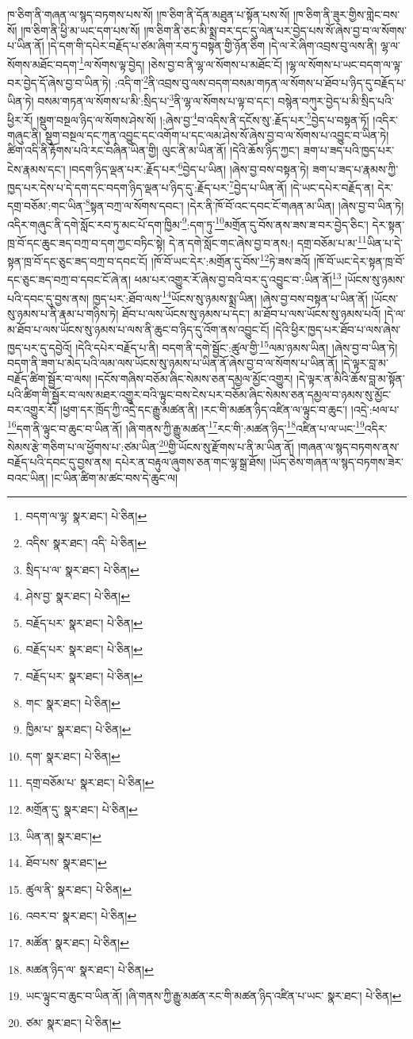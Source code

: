 ཁ་ཅིག་ནི་གཞན་ལ་སྙད་བཏགས་པས་སོ། །ཁ་ཅིག་ནི་དོན་མཐུན་པ་སྟོན་པས་སོ། །ཁ་ཅིག་ནི་ཟུར་གྱིས་གླེང་བས་སོ། །ཁ་ཅིག་ནི་ཕྱི་མ་ཡང་དག་པས་སོ། །ཁ་ཅིག་ནི་ཅང་མི་སྨྲ་བར་དང་དུ་ལེན་པར་བྱེད་པས་སོ་ཞེས་བྱ་བ་ལ་སོགས་པ་ཡིན་ནོ། །དེ་དག་གི་དཔེར་བརྗོད་པ་ཙམ་ཞིག་རབ་ཏུ་བསྟན་གྱི་ཉོན་ཅིག །དེ་ལ་རེ་ཞིག་འབྲས་བུ་ལས་ནི། ལྷ་ལ་སོགས་མཐོང་བདག་\footnote{བདག་ལ་ལྷ་  སྣར་ཐང་།  པེ་ཅིན། }ལ་སོགས་ལྟ་བྱེད། །ཅེས་བྱ་བ་ནི་ལྷ་ལ་སོགས་པ་མཐོང་ངོ། །ལྷ་ལ་སོགས་པ་ཡང་བདག་ལ་ལྟ་བར་བྱེད་དོ་ཞེས་བྱ་བ་ཡིན་ཏེ། :འདི་ག་\footnote{འདིས་  སྣར་ཐང་། འདི་  པེ་ཅིན། }ནི་འབྲས་བུ་ལས་བདག་བསམ་གཏན་ལ་སོགས་པ་ཐོབ་པ་ཉིད་དུ་བརྗོད་པ་ཡིན་ཏེ། བསམ་གཏན་ལ་སོགས་པ་མི་:སྲིད་པ་\footnote{སྲིད་པ་ལ་  སྣར་ཐང་།  པེ་ཅིན། }ནི་ལྷ་ལ་སོགས་པ་ལྟ་བ་དང་། བསྙེན་བཀུར་བྱེད་པ་མི་སྲིད་པའི་ཕྱིར་རོ། །སྡུག་བསྔལ་ཉིད་ལ་སོགས་ཤེས་སོ། །:ཞེས་བྱ་\footnote{ཤེས་བྱ་  སྣར་ཐང་།  པེ་ཅིན། }བ་འདིས་ནི་དངོས་སུ་:རྗོད་པར་\footnote{བརྗོད་པར་  སྣར་ཐང་།  པེ་ཅིན། }བྱེད་པ་བསྟན་ཏོ། །འདིར་གཞུང་ནི། སྡུག་བསྔལ་དང་ཀུན་འབྱུང་དང་འགོག་པ་དང་ལམ་ཤེས་སོ་ཞེས་བྱ་བ་ལ་སོགས་པ་འབྱུང་བ་ཡིན་ཏེ། ཚིག་འདི་ནི་རྟོགས་པའི་རང་བཞིན་ཡིན་གྱི། ལུང་ནི་མ་ཡིན་ནོ། །དེའི་ཆོས་ཉིད་ཀྱང་། ཟག་པ་ཟད་པའི་ཁྱད་པར་ངེས་རྣམས་དང་། །བདག་ཉིད་ལྡན་པར་:རྗོད་པར་\footnote{བརྗོད་པར་  སྣར་ཐང་།  པེ་ཅིན། }བྱེད་པ་ཡིན། །ཞེས་བྱ་བས་བསྟན་ཏེ། ཟག་པ་ཟད་པ་རྣམས་ཀྱི་ཁྱད་པར་དེས་པ་དེ་དག་དང་བདག་ཉིད་ལྡན་པ་ཉིད་དུ་:རྗོད་པར་\footnote{བརྗོད་པར་  སྣར་ཐང་།  པེ་ཅིན། }བྱེད་པ་ཡིན་ནོ། །དེ་ཡང་དཔེར་བརྗོད་ན། དེར་དགྲ་བཅོམ་:གང་ཡིན་\footnote{གང་  སྣར་ཐང་།  པེ་ཅིན། }སྟན་བཀྲ་ལ་སོགས་དབང་། །དེར་ནི་ཁོ་བོ་འང་དབང་ངོ་གཞན་མ་ཡིན། །ཞེས་བྱ་བ་ཡིན་ཏེ། འདིར་གཞུང་ནི་དགེ་སློང་རབ་ཏུ་མང་པོ་དག་ཁྱིམ་\footnote{ཁྱིམ་པ་  སྣར་ཐང་།  པེ་ཅིན། }:དག་ཏུ་\footnote{དག་  སྣར་ཐང་།  པེ་ཅིན། }མགྲོན་དུ་བོས་ནས་ཟས་ཟ་བར་བྱེད་ཅིང་། དེར་སྟན་ཁྲ་བོ་དང་ཆུང་ཟད་བཀྲ་བ་དག་ཀྱང་བཏིང་སྟེ། དེ་ན་དགེ་སློང་གང་ཞེས་བྱ་བ་ནས:། དགྲ་བཅོམ་པ་མ་\footnote{དགྲ་བཅོམ་པ་  སྣར་ཐང་།  པེ་ཅིན། }ཡིན་པ་དེ་སྟན་ཁྲ་བོ་དང་ཅུང་ཟད་བཀྲ་བ་དབང་ངོ། །ཁོ་བོ་ཡང་དེར་:མགྲོན་དུ་བོས་\footnote{མགྲོན་དུ་  སྣར་ཐང་།  པེ་ཅིན། }ཏེ་ཟས་ཟའོ། །ཁོ་བོ་ཡང་དེར་སྟན་ཁྲ་བོ་དང་ཅུང་ཟད་བཀྲ་བ་དབང་ངོ་ཞེ་ན། ཕམ་པར་འགྱུར་རོ་ཞེས་བྱ་བའི་བར་དུ་འབྱུང་བ་:ཡིན་ནོ།\footnote{ཡིན་ན།  སྣར་ཐང་། } །ཡོངས་སུ་ཉམས་པའི་དབང་དུ་བྱས་ནས། ཁྱད་པར་:ཐོབ་ལས་\footnote{ཐོབ་པས་  སྣར་ཐང་། }ཡོངས་སུ་ཉམས་སྨྲ་ཡིན། །ཞེས་བྱ་བས་བསྟན་པ་ཡིན་ནོ། །ཡོངས་སུ་ཉམས་པ་ནི་རྣམ་པ་གཉིས་ཏེ། ཐོབ་པ་ལས་ཡོངས་སུ་ཉམས་པ་དང་། མ་ཐོབ་པ་ལས་ཡོངས་སུ་ཉམས་པའོ། །དེ་ལ་མ་ཐོབ་པ་ལས་ཡོངས་སུ་ཉམས་པ་ལས་ནི་ཆུང་བ་ཉིད་དུ་འོག་ནས་འབྱུང་ངོ། །དེའི་ཕྱིར་ཁྱད་པར་ཐོབ་པ་ལས་ཞེས་ཁྱད་པར་དུ་དབྱེའོ། །དེའི་དཔེར་བརྗོད་པ་ནི། བདག་ནི་དགེ་སྦྱོང་:ཚུལ་གྱི་\footnote{ཚུལ་ནི་  སྣར་ཐང་།  པེ་ཅིན། }ལམ་ཉམས་ཡིན། །ཞེས་བྱ་བ་ཡིན་ཏེ། བདག་ནི་ཟག་པ་མེད་པའི་ལམ་ལས་ཡོངས་སུ་ཉམས་པ་ཡིན་ནོ་ཞེས་བྱ་བ་ལ་སོགས་པ་ཡིན་ནོ། །དེ་ལྟར་བླ་མ་བརྗོད་ཚིག་སྦྱོར་བ་ལས། །དངོས་གཞིས་བཅོམ་ཞིང་སེམས་ཅན་དམྱལ་མྱོང་འགྱུར། །དེ་ལྟར་ན་མིའི་ཆོས་བླ་མ་སྟོན་པའི་ཚིག་གི་སྦྱོར་བ་ལས་མཐར་འགྱུར་བའི་ལྟུང་བས་ངེས་པར་བཅོམ་ཞིང་སེམས་ཅན་དམྱལ་བ་ཉམས་སུ་མྱོང་བར་འགྱུར་རོ། །ཕྱག་དར་ཁྲོད་ཀྱི་འདྲེ་དང་རྒྱུ་མཚན་ནི། །རང་གི་མཚན་ཉིད་འཛིན་ལ་ལྟུང་བ་ཆུང་། །འདྲེ་:ཕལ་པ་\footnote{འབར་བ་  སྣར་ཐང་།  པེ་ཅིན། }དག་ནི་ལྟུང་བ་ཆུང་བ་ཡིན་ནོ། །ཞི་གནས་ཀྱི་རྒྱུ་མཚན་\footnote{མཚོན་  སྣར་ཐང་།  པེ་ཅིན། }རང་གི་:མཚན་ཉིད་\footnote{མཚན་ཉིད་ལ་  སྣར་ཐང་།  པེ་ཅིན། }འཛིན་པ་ལ་ཡང་\footnote{ཡང་ལྟུང་བ་ཆུང་བ་ཡིན་ནོ། །ཞི་གནས་ཀྱི་རྒྱུ་མཚན་རང་གི་མཚན་ཉིད་འཛིན་པ་ཡང་  སྣར་ཐང་།  པེ་ཅིན། }འདིར་སེམས་རྩེ་གཅིག་པ་ལ་ཕྱོགས་པ་:ཙམ་ཡིན་\footnote{ཙམ་  སྣར་ཐང་།  པེ་ཅིན། }གྱི་ཡོངས་སུ་རྫོགས་པ་ནི་མ་ཡིན་ནོ། །གཞན་ལ་སྙད་བཏགས་ནས་བརྗོད་པའི་དབང་དུ་བྱས་ནས། དཔེར་ན་བརྟུལ་ཞུགས་ཅན་གང་ལྷ་སྒྲ་ཐོས། །ཡོད་ཅེས་གཞན་ལ་སྙད་བཏགས་ཟེར་བའང་ཡིན། །ང་ཡིན་ཚིག་མ་ཚང་བས་དེ་ཆུང་ལ། 